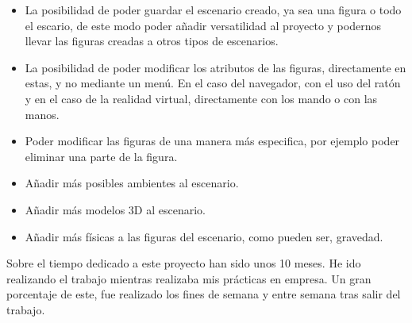 \documentclass[a4paper, 12pt]{book}
\begin{document}
\begin{itemize}
    \item La posibilidad de poder guardar el escenario creado, ya sea una figura o todo el escario, de este modo poder añadir versatilidad al proyecto y podernos llevar las figuras creadas a otros tipos de escenarios.
    \item La posibilidad de poder modificar los atributos de las figuras, directamente en estas, y no mediante un menú. En el caso del navegador, con el uso del ratón y en el caso de la realidad virtual, directamente con los mando o con las manos.
    \item Poder modificar las figuras de una manera más especifica, por ejemplo poder eliminar una parte de la figura.
    \item Añadir más posibles ambientes al escenario.
    \item Añadir más modelos 3D al escenario.
    \item Añadir más físicas a las figuras del escenario, como pueden ser, gravedad.
\end{itemize}

Sobre el tiempo dedicado a este proyecto han sido unos 10 meses. He ido realizando el trabajo mientras realizaba mis prácticas en empresa. Un gran porcentaje de este, fue realizado los fines de semana y entre semana tras salir del trabajo.

\cleardoublepage


\end{document}
